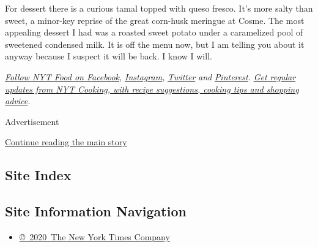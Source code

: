 For dessert there is a curious tamal topped with queso fresco. It's more
salty than sweet, a minor-key reprise of the great corn-husk meringue at
Cosme. The most appealing dessert I had was a roasted sweet potato under
a caramelized pool of sweetened condensed milk. It is off the menu now,
but I am telling you about it anyway because I suspect it will be back.
I know I will.

\href{https://www.facebookcorewwwi.onion/nytfood/}{\emph{Follow NYT Food
on Facebook}}\emph{,}
\href{https://instagram.com/nytfood}{\emph{Instagram}}\emph{,}
\href{https://twitter.com/nytfood}{\emph{Twitter}} \emph{and}
\href{https://www.pinterest.com/nytfood/}{\emph{Pinterest}}\emph{.}
\href{https://www.nytimes3xbfgragh.onion/newsletters/cooking}{\emph{Get
regular updates from NYT Cooking, with recipe suggestions, cooking tips
and shopping advice}}\emph{.}

Advertisement

\protect\hyperlink{after-bottom}{Continue reading the main story}

\hypertarget{site-index}{%
\subsection{Site Index}\label{site-index}}

\hypertarget{site-information-navigation}{%
\subsection{Site Information
Navigation}\label{site-information-navigation}}

\begin{itemize}
\tightlist
\item
  \href{https://help.nytimes3xbfgragh.onion/hc/en-us/articles/115014792127-Copyright-notice}{©~2020~The
  New York Times Company}
\end{itemize}

